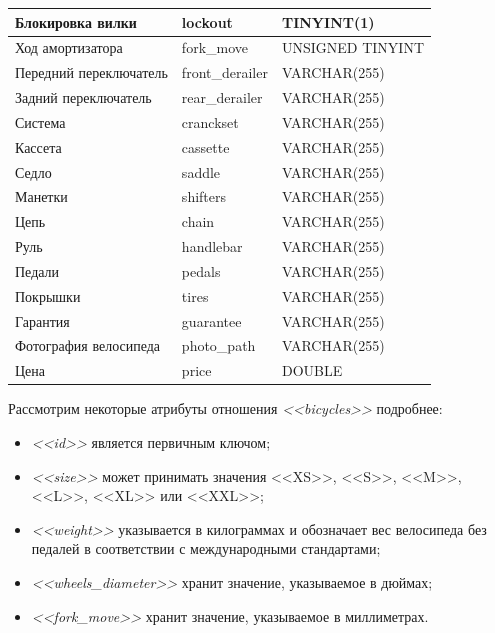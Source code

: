 \begin{table}[h!]
{\begin{tabular}{| p{} | p{} | p{} |}
      \hline
      Блокировка вилки & lockout & TINYINT(1) \\

      \hline
      Ход амортизатора & fork\_move & UNSIGNED TINYINT \\

      \hline
      Передний переключатель & front\_derailer & VARCHAR(255) \\

      \hline
      Задний переключатель & rear\_derailer & VARCHAR(255) \\

      \hline
      Система & cranckset & VARCHAR(255) \\

      \hline
      Кассета & cassette & VARCHAR(255) \\

      \hline
      Седло & saddle & VARCHAR(255) \\

      \hline
      Манетки & shifters & VARCHAR(255) \\

      \hline
      Цепь & chain & VARCHAR(255) \\

      \hline
      Руль & handlebar & VARCHAR(255) \\

      \hline
      Педали & pedals & VARCHAR(255) \\

      \hline
      Покрышки & tires & VARCHAR(255) \\

      \hline
      Гарантия & guarantee & VARCHAR(255) \\

      \hline
      Фотография велосипеда & photo\_path & VARCHAR(255) \\

      \hline
      Цена & price & DOUBLE \\

      \hline
    \end{tabular}
  }
\end{table}

Рассмотрим некоторые атрибуты отношения \textit{<<bicycles>>} подробнее:
\begin{itemize}
  \item \textit{<<id>>} является первичным ключом;
  \item \textit{<<size>>} может принимать значения <<XS>>, <<S>>, <<M>>, <<L>>, <<XL>> или <<XXL>>;
  \item \textit{<<weight>>} указывается в килограммах и обозначает вес велосипеда
    без педалей в соответствии с международными стандартами;
  \item \textit{<<wheels\_diameter>>} хранит значение, указываемое в дюймах;
  \item \textit{<<fork\_move>>} хранит значение, указываемое в миллиметрах.
\end{itemize}

